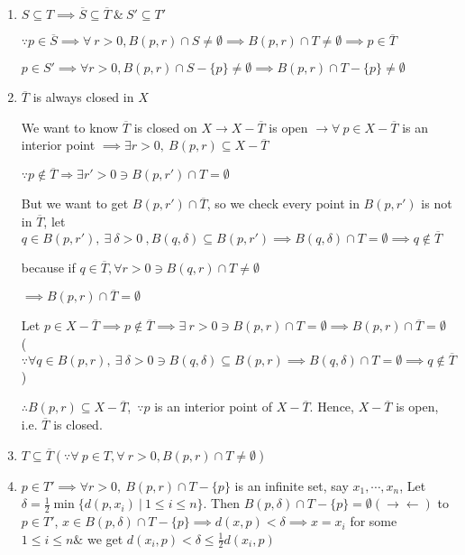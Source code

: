 \begin{enumerate}[wide,label=\textbf{(\arabic*)}]
	\item $S \subseteq T \implies \overline{S} \subseteq \overline{T} ~\&~ S' \subseteq T'$
	 
	$\because p \in \overline{S} \implies \forall~ r>0,B(p,r) \cap S \neq \emptyset \implies B(p,r) \cap T \neq \emptyset \implies p \in \overline{T}$
	
	$p \in S' \implies \forall r > 0,B(p,r)\cap S - \{p\} \neq \emptyset \implies B(p,r) \cap T - \{p\} \neq \emptyset$
	
	\item $\overline{T}$ is always closed in $X$
	
	\begin{tcolorbox}
		We want to know $\overline{T}$ is closed on $X \rightarrow X - \overline{T}$ is open $\rightarrow \forall~p \in X - \overline{T}$ is an interior point $\implies \exists r > 0,~B(p,r) \subseteq X - \overline{T}$
		
		$\because p \notin \overline{T} \Rightarrow \exists r' > 0 \ni B(p,r') \cap T = \emptyset$
		
		But we want to get $B(p,r') \cap \overline{T}$, so we check every point in $B(p,r')$ is not in $\overline{T}$, let $q \in B(p,r') ,~\exists ~\delta > 0 ~,B(q,\delta) \subseteq B(p,r') \implies B(q,\delta) \cap T = \emptyset \implies q \notin \overline{T}$
		
		because if $q \in \overline{T},\forall r > 0 \ni B(q,r) \cap T \neq \emptyset$
		
		$\implies B(p,r) \cap \overline{T} = \emptyset$
	\end{tcolorbox}
	
	Let $p \in X - \overline{T} \implies p \notin \overline{T} \implies \exists~r>0 \ni B(p,r) \cap T = \emptyset \implies B(p,r) \cap \overline{T} = \emptyset$ ($\because \forall q \in B(p,r),~\exists~\delta > 0 \ni B(q,\delta) \subseteq B(p,r) \implies B(q,\delta) \cap T = \emptyset \implies q \notin \overline{T}$)
	
	$\therefore B(p,r) \subseteq X - \overline{T}$,~$\because p$ is an interior point of $X - \overline{T}$. Hence, $X - \overline{T}$ is open, i.e. $\overline{T}$ is closed.
	
	\item $T \subseteq \overline{T}(\because \forall~p \in T, \forall ~ r > 0,B(p,r) \cap T \neq \emptyset)$
	\newpage
	\item $p \in T' \implies \forall r > 0,~ B(p,r) \cap T - \{p\}$ is an infinite set, say $x_1,\cdots,x_n$, Let $\delta = \frac{1}{2} \min \{d(p,x_i)~|~1\leq i \leq n\}$. Then $B(p,\delta) \cap T - \{p\} = \emptyset (\rightarrow\leftarrow)$ to $p \in T'$, $x \in B(p,\delta) \cap T - \{p\} \implies d(x,p) < \delta \implies x = x_i$ for some $1 \leq i \leq n \&$ we get $d(x_i,p) < \delta \leq \frac{1}{2}d(x_i,p)$
	

\end{enumerate}
